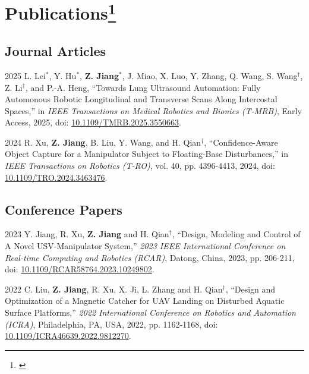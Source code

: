 \documentclass[11pt,letterpaper]{report}
\begin{document}
\section*{Publications\protect\footnote{\label{authorship}}}
\subsection*{Journal Articles}
\begin{tablist}
	\item[2025]	 \tab{}L. Lei$^*$, Y. Hu$^*$, \textbf{Z. Jiang}$^*$, J. Miao, X. Luo, Y. Zhang, Q. Wang, S. Wang$^\dagger$, Z. Li$^\dagger$, and P.-A. Heng, ``Towards Lung Ultrasound Automation: Fully Automonous Robotic Longitudinal and Transverse Scans Along Intercostal Spaces,'' in \textit{IEEE Transactions on Medical Robotics and Bionics (T-MRB)}, Early Access, 2025, doi: \href{https://doi.org/10.1109/TMRB.2025.3550663}{10.1109/TMRB.2025.3550663}.
	
	\item[2024]  \tab{}R. Xu, \textbf{Z. Jiang}, B. Liu, Y. Wang, and H. Qian$^\dagger$, ``Confidence-Aware Object Capture for a Manipulator Subject to Floating-Base Disturbances,'' in \textit{IEEE Transactions on Robotics (T-RO)}, vol. 40, pp. 4396-4413, 2024,  doi: \href{https://doi.org/10.1109/TRO.2024.3463476}{10.1109/TRO.2024.3463476}.
\end{tablist}
	
\subsection*{Conference Papers}
\begin{tablist}
	\item[2023]   \tab{}Y. Jiang, R. Xu, \textbf{Z. Jiang} and H. Qian$^\dagger$, ``Design, Modeling and Control of A Novel USV-Manipulator System,'' \textit{2023 IEEE International Conference on Real-time Computing and Robotics (RCAR)}, Datong, China, 2023, pp. 206-211, doi: \href{https://doi.org/10.1109/RCAR58764.2023.10249802}{ 10.1109/RCAR58764.2023.10249802}.
		
	\item[2022]   \tab{}C. Liu, \textbf{Z. Jiang}, R. Xu, X. Ji, L. Zhang and H. Qian$^\dagger$, ``Design and Optimization of a Magnetic Catcher for UAV Landing on Disturbed Aquatic Surface Platforms,'' \textit{2022 International Conference on Robotics and Automation (ICRA)}, Philadelphia, PA, USA, 2022, pp. 1162-1168, doi: \href{https://doi.org/10.1109/ICRA46639.2022.9812270}{ 10.1109/ICRA46639.2022.9812270}.
\end{tablist}
	
\end{document}
